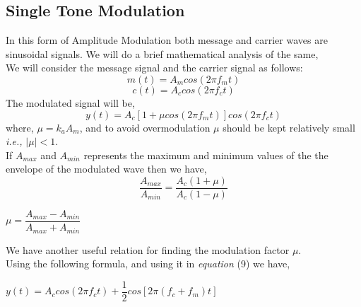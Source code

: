 \documentclass[12pt,a4paper]{article}%
\begin{document}
\begin{flushleft}
		\subsection{Single Tone Modulation}
		\begin{flushleft}
			In this form of Amplitude Modulation both message and carrier waves are sinusoidal signals. We will do a brief mathematical analysis of the same,\\\smallskip
			We will consider the message signal and the carrier signal as follows:\\\smallskip
			\begin{equation}
			m(t)=A_m cos(2 \pi f_m t)
			\end{equation}
			\begin{equation}
			c(t)=A_c cos(2 \pi f_c t)
			\end{equation}
			The modulated signal will be,
			\begin{equation}
			y(t)=A_c [1+\mu cos(2 \pi f_m t)] cos(2 \pi f_c t)
			\end{equation}
			where, $\mu = k_a A_m$, and to avoid overmodulation $\mu$ should be kept relatively small \textit{i.e.,} $|\mu|<1$.\\\smallskip
			If $A_{max}$ and $A_{min}$ represents the maximum and minimum values of the the envelope of the modulated wave then we have,
			\begin{equation}
			\dfrac{A_{max}}{A_{min}}=\dfrac{A_c (1+\mu)}{A_c (1-\mu)}
			\end{equation}
			\begin{center}
				$\mu =\dfrac{A_{max} - A_{min}}{A_{max} + A_{min}}$
			\end{center}
			We have another useful relation for finding the modulation factor $\mu$.\\\smallskip
			Using the following formula, and using it in \textit{equation} (9) we have,
			\begin{center}
				$y(t)=A_c cos(2 \pi f_c t) + \dfrac{1}{2}cos[2 \pi (f_c +f_m)t]$
			\end{center}
		\end{flushleft}
		

\end{flushleft}
\end{document}
